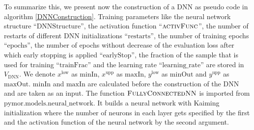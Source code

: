 To summarize this, we present now the construction of a DNN as pseudo code in algorithm \ref{DNNConstruction}. Training parameters like the neural network structure ``$\mathrm{DNNStructure}$'', the activation function ``$\textproc{activFunc}$'', the number of restarts of different DNN initializations ``$\mathrm{restarts}$'', the number of training epochs ``$\mathrm{epochs}$'', the number of epochs without decrease of the evaluation loss after which early stopping is applied ``$\mathrm{earlyStop}$'', the fraction of the sample that is used for training ``$\mathrm{trainFrac}$'' and the learning rate ``$\mathrm{learning\_rate}$'' are stored in $V_\mathrm{DNN}$. We denote $x^\mathrm{low}$ as $\mathrm{minIn}$, $x^\mathrm{upp}$ as $\mathrm{maxIn}$, $y^\mathrm{low}$ as $\mathrm{minOut}$ and $y^\mathrm{upp}$ as $\mathrm{maxOut}$. $\mathrm{minIn}$ and $\mathrm{maxIn}$ are calculated before the construction of the DNN and are taken as an input. The function $\textproc{FullyConnectedNN}$ is imported from $\mathrm{pymor.models.neural\_network}$. It builds a neural network with Kaiming initialization where the number of neurons in each layer gets specified by the first and the activation function of the neural network by the second argument.

